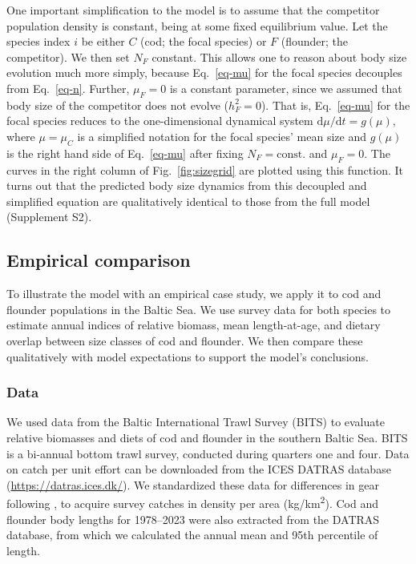 \documentclass[12pt]{article}
\newcommand{\ud}{\text{d}}
\begin{document}
One important simplification to the model is to assume that the competitor population density is constant, being at some fixed equilibrium value. Let the species index $i$ be either $C$ (cod; the focal species) or $F$ (flounder; the competitor). We then set $N_F$ constant. This allows one to reason about body size evolution much more simply, because Eq.~\ref{eq-mu} for the focal species decouples from Eq.~\ref{eq-n}. Further, $\mu_F = 0$ is a constant parameter, since we assumed that body size of the competitor does not evolve ($h_F^2 = 0$). That is, Eq.~\ref{eq-mu} for the focal species reduces to the one-dimensional dynamical system $\ud \mu / \ud t = g(\mu)$, where $\mu = \mu_C$ is a simplified notation for the focal species' mean size and $g(\mu)$ is the right hand side of Eq.~\ref{eq-mu} after fixing $N_F = \text{const.}$ and $\mu_F = 0$. The curves in the right column of Fig.~\ref{fig:sizegrid} are plotted using this function. It turns out that the predicted body size dynamics from this decoupled and simplified equation are qualitatively identical to those from the full model (Supplement S2).


\subsection*{Empirical comparison}

To illustrate the model with an empirical case study, we apply it to cod and flounder populations in the Baltic Sea. We use survey data for both species to estimate annual indices of relative biomass, mean length-at-age, and dietary overlap between size classes of cod and flounder. We then compare these qualitatively with model expectations to support the model's conclusions.

\subsubsection*{Data}

We used data from the Baltic International Trawl Survey (BITS) to evaluate relative biomasses and diets of cod and flounder in the southern Baltic Sea. BITS is a bi-annual bottom trawl survey, conducted during quarters one and four. Data on catch per unit effort can be downloaded from the ICES DATRAS database (\url{https://datras.ices.dk/}). We standardized these data for differences in gear following \citep{Orio2017, Lindmark2023}, to acquire survey catches in density per area (kg/km\textsuperscript{2}). Cod and flounder body lengths for 1978–2023 were also extracted from the DATRAS database, from which we calculated the annual mean and 95th percentile of length.
\end{document}
